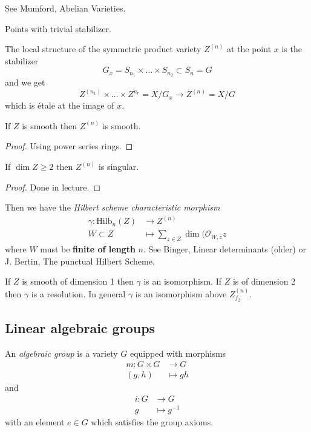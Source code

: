 See Mumford, Abelian Varieties.

\begin{definition}
\label{definition-free-locus}
Points with trivial stabilizer.
\end{definition}

The local structure of  the symmetric product variety $Z^{(n)}$ 
at the point $x$ is the stabilizer
$$
G_x=S_{n_1}\times\ldots\times S_{n_2}\subset S_n=G
$$
and we get
$$
Z^{(n_1)}\times\ldots\times Z^{n_r} = X/G_x \to Z^{(n)}=X/G
$$
which is étale at the image of $x$.

\begin{proposition}
\label{proposition-variety-smooth-then-symmetric-product-smooth}
If $Z$ is smooth then $Z^{(n)}$ is smooth.
\end{proposition}

\begin{proof}
Using power series rings.
\end{proof}

\begin{proposition}
\label{proposition-simension-geq2-then-symmetric-product-singular}
If $\dim Z \geq 2$ then $Z^{(n)}$ is singular.
\end{proposition}

\begin{proof}
Done in lecture.
\end{proof}

\medskip\noindent
Then we have the {\it Hilbert scheme characteristic morphism}
\begin{align*}
\gamma: \text{Hilb}_n(Z) &\longrightarrow Z^{(n)} \\
W\subset Z &\longmapsto \sum_{z \in Z}\dim (\mathcal{O}_{W,z}z
\end{align*}
where $W$ must be {\bf finite of length }$n$. See Binger, Linear determinants
(older) or J. Bertin, The punctual Hilbert Scheme.

If $Z$ is smooth of dimension 1 then $\gamma$ is an isomorphism. If $Z$ is of
dimension 2 then $\gamma$ is a resolution. In general $\gamma$ is an isomorphism
above $Z_{f_2}^{(n)}$.

\subsection*{Linear algebraic groups}
\label{subsection-linear-algebraic-groups}
\begin{definition}
\label{definition-algebraic-group}
An {\it algebraic group} is a variety $G$ equipped with morphisms
\begin{align*}
m: G\times G &\longrightarrow G \\
(g,h) &\longmapsto gh
\end{align*}
and
\begin{align*}
i: G &\longrightarrow G \\
g &\longmapsto g^{-1}
\end{align*}
with an element $e \in G$ which satisfies the group axioms.
\end{definition}

